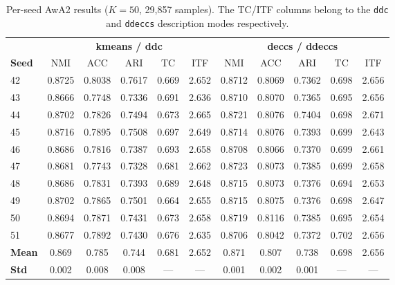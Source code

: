 \begin{table}[H]
    \centering
    \footnotesize
    \setlength{\tabcolsep}{4pt}
    \caption[Per-seed AwA2 results]{Per-seed AwA2 results ($K = 50$, 29{,}857 samples). The TC/ITF columns belong to the \texttt{ddc} and \texttt{ddeccs} description modes respectively.}
    \label{tab:awa2_perseed}
    \begin{tabular}{lccccc|ccccc}
        \hline
        & \multicolumn{5}{c|}{\textbf{kmeans / ddc}} & \multicolumn{5}{c}{\textbf{deccs / ddeccs}} \\
        \textbf{Seed} & NMI & ACC & ARI & TC & ITF & NMI & ACC & ARI & TC & ITF \\
        \hline
        42 & 0.8725 & 0.8038 & 0.7617 & 0.669 & 2.652 & 0.8712 & 0.8069 & 0.7362 & 0.698 & 2.656 \\
        43 & 0.8666 & 0.7748 & 0.7336 & 0.691 & 2.636 & 0.8710 & 0.8070 & 0.7365 & 0.695 & 2.656 \\
        44 & 0.8702 & 0.7826 & 0.7494 & 0.673 & 2.665 & 0.8721 & 0.8076 & 0.7404 & 0.698 & 2.671 \\
        45 & 0.8716 & 0.7895 & 0.7508 & 0.697 & 2.649 & 0.8714 & 0.8076 & 0.7393 & 0.699 & 2.643 \\
        46 & 0.8686 & 0.7816 & 0.7387 & 0.693 & 2.658 & 0.8708 & 0.8066 & 0.7370 & 0.699 & 2.661 \\
        47 & 0.8681 & 0.7743 & 0.7328 & 0.681 & 2.662 & 0.8723 & 0.8073 & 0.7385 & 0.699 & 2.658 \\
        48 & 0.8686 & 0.7831 & 0.7393 & 0.689 & 2.648 & 0.8715 & 0.8073 & 0.7376 & 0.694 & 2.653 \\
        49 & 0.8702 & 0.7865 & 0.7501 & 0.664 & 2.655 & 0.8715 & 0.8075 & 0.7376 & 0.698 & 2.647 \\
        50 & 0.8694 & 0.7871 & 0.7431 & 0.673 & 2.658 & 0.8719 & 0.8116 & 0.7385 & 0.695 & 2.654 \\
        51 & 0.8677 & 0.7892 & 0.7430 & 0.676 & 2.635 & 0.8706 & 0.8042 & 0.7372 & 0.702 & 2.656 \\
        \hline
        \textbf{Mean} & 0.869 & 0.785 & 0.744 & 0.681 & 2.652 & 0.871 & 0.807 & 0.738 & 0.698 & 2.656 \\
        \textbf{Std} & 0.002 & 0.008 & 0.008 & --- & --- & 0.001 & 0.002 & 0.001 & --- & --- \\
        \hline
    \end{tabular}
\end{table}

